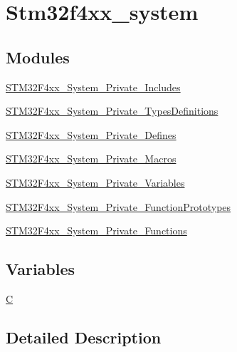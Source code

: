 \hypertarget{group__stm32f4xx__system}{\section{Stm32f4xx\-\_\-system}
\label{group__stm32f4xx__system}
}
\subsection*{Modules}
\begin{DoxyCompactItemize}
\item 
\hyperlink{group___s_t_m32_f4xx___system___private___includes}{S\-T\-M32\-F4xx\-\_\-\-System\-\_\-\-Private\-\_\-\-Includes}
\item 
\hyperlink{group___s_t_m32_f4xx___system___private___types_definitions}{S\-T\-M32\-F4xx\-\_\-\-System\-\_\-\-Private\-\_\-\-Types\-Definitions}
\item 
\hyperlink{group___s_t_m32_f4xx___system___private___defines}{S\-T\-M32\-F4xx\-\_\-\-System\-\_\-\-Private\-\_\-\-Defines}
\item 
\hyperlink{group___s_t_m32_f4xx___system___private___macros}{S\-T\-M32\-F4xx\-\_\-\-System\-\_\-\-Private\-\_\-\-Macros}
\item 
\hyperlink{group___s_t_m32_f4xx___system___private___variables}{S\-T\-M32\-F4xx\-\_\-\-System\-\_\-\-Private\-\_\-\-Variables}
\item 
\hyperlink{group___s_t_m32_f4xx___system___private___function_prototypes}{S\-T\-M32\-F4xx\-\_\-\-System\-\_\-\-Private\-\_\-\-Function\-Prototypes}
\item 
\hyperlink{group___s_t_m32_f4xx___system___private___functions}{S\-T\-M32\-F4xx\-\_\-\-System\-\_\-\-Private\-\_\-\-Functions}
\end{DoxyCompactItemize}
\subsection*{Variables}
\begin{DoxyCompactItemize}
\item 
\hyperlink{group__stm32f4xx__system_gaaa53ca0b650dfd85c4f59fa156f7a2cc}{C}
\end{DoxyCompactItemize}


\subsection{Detailed Description}


